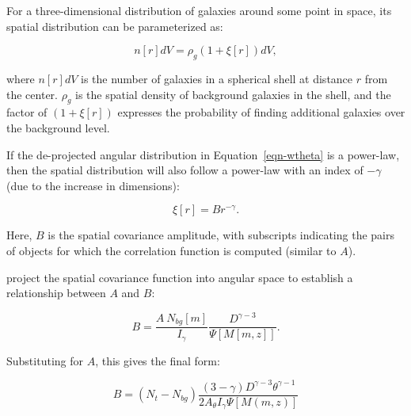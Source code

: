 \documentclass[useAMS,usenatbib]{mn2e}
\begin{document}

For a three-dimensional distribution of galaxies around some point in space, its spatial distribution can be parameterized as:

\begin{equation}
n[r]dV = \rho_g (1 + \xi[r]) dV,
\end{equation}

\noindent where $n[r]dV$ is the number of galaxies in a spherical shell at distance $r$ from the center. $\rho_g$ is the spatial density of background galaxies in the shell, and the factor of $(1+\xi[r])$ expresses the probability of finding additional galaxies over the background level. 

If the de-projected angular distribution in Equation~\ref{eqn-wtheta} is a power-law, then the spatial distribution will also follow a power-law with an index of $-\gamma$ (due to the increase in dimensions):

\begin{equation}
\xi[r] = Br^{-\gamma}.
\end{equation}

\noindent Here, $B$ is the spatial covariance amplitude, with subscripts indicating the pairs of objects for which the correlation function is computed (similar to $A$). 


\citet{lon79} project the spatial covariance function into angular space to establish a relationship between $A$ and $B$: 

\begin{equation}
\label{eqn-atob}
B = \frac{A~N_{bg}[m]}{I_\gamma} \frac{D^{\gamma-3}}{\Psi[M[m,z]]}.
\end{equation}

Substituting for $A$, this gives the final form:

\begin{equation}
\label{eqn-bgb}
B = (N_t - N_{bg})\frac{(3-\gamma) D^{\gamma-3} \theta^{\gamma-1}}{2 A_\theta I_\gamma \Psi[M(m,z)]}
\end{equation}
\end{document}

